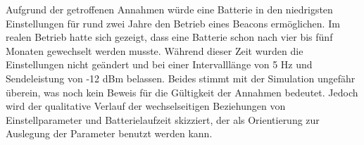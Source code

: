 Aufgrund der getroffenen Annahmen würde eine Batterie in den niedrigsten Einstellungen für rund zwei Jahre den Betrieb eines Beacons ermöglichen. Im realen Betrieb hatte sich gezeigt, dass eine Batterie schon nach vier bis fünf Monaten gewechselt werden musste. Während dieser Zeit wurden die Einstellungen nicht geändert und bei einer Intervalllänge von 5 Hz und Sendeleistung von -12 dBm belassen. Beides stimmt mit der Simulation ungefähr überein, was noch kein Beweis für die Gültigkeit der Annahmen bedeutet. Jedoch wird der qualitative Verlauf der wechselseitigen Beziehungen von Einstellparameter und Batterielaufzeit skizziert, der als Orientierung zur Auslegung der Parameter benutzt werden kann.